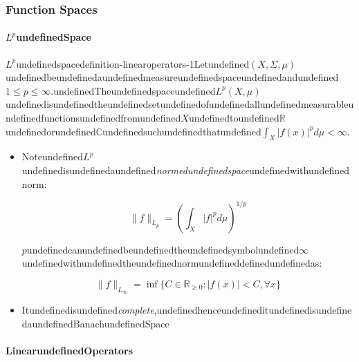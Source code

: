 \subsubsection{Function Spaces}

\paragraph{$L^p$undefinedSpace}

\begin{mystthmdefinition}{$L^p$undefinedspace}{definition-linearoperators-1}Letundefined$(X,\Sigma, \mu)$undefinedbeundefinedaundefinedmeasureundefinedspaceundefinedandundefined$1\leq p\leq \infty$.undefinedTheundefinedspaceundefined$L^p(X,\mu)$undefinedisundefinedtheundefinedsetundefinedofundefinedallundefinedmeasurableundefinedfunctionsundefinedfromundefined$X$undefinedtoundefined$\mathbb{R}$undefinedorundefined$\mathbb{C}$undefinedsuchundefinedthatundefined$\int_X |f(x)|^p d\mu < \infty$.

\begin{itemize}
\item Noteundefined$L^p$undefinedisundefinedaundefined\textit{normedundefinedspace}undefinedwithundefinednorm:

\begin{equation}
\|f\|_{L_p}=\left(\int_X |f|^p d\mu\right)^{1/p}
\end{equation}


$p$undefinedcanundefinedbeundefinedtheundefinedsymbolundefined$\infty$undefinedwithundefinedtheundefinednormundefineddefinedundefinedas:

\begin{equation}
\|f\|_{L_{\infty}} = \inf\{C\in \mathbb{R}_{\geq 0} : |f(x)|<C, \forall x\}
\end{equation}


\item Itundefinedisundefined\textit{complete},undefinedhenceundefineditundefinedisundefinedaundefinedBanachundefinedSpace
\end{itemize}

\end{mystthmdefinition}
\paragraph{LinearundefinedOperators}

